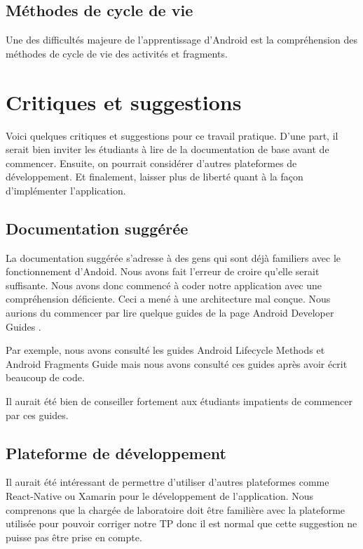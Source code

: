 \documentclass[12pt]{article}
\begin{document}
\subsection{Méthodes de cycle de vie}

	Une des difficultés majeure de l'apprentissage d'Android est la
	compréhension des méthodes de cycle de vie des activités et fragments.

\section{Critiques et suggestions}

	Voici quelques critiques et suggestions pour ce travail pratique.  D'une
	part, il serait bien inviter les étudiants à lire de la documentation de
	base avant de commencer. Ensuite, on pourrait considérer d'autres
	plateformes de développement. Et finalement, laisser plus de liberté quant à
	la façon d'implémenter l'application.

\subsection{Documentation suggérée}

	La documentation suggérée s'adresse à des gens qui sont déjà familiers avec
	le fonctionnement d'Andoid.  Nous avons fait l'erreur de croire qu'elle
	serait suffisante.  Nous avons donc commencé à coder notre application avec
	une compréhension déficiente.  Ceci a mené à une architecture mal conçue.
	Nous aurions du commencer par lire quelque guides de la page Android
	Developer Guides .

	Par exemple, nous avons consulté les guides Android Lifecycle Methods
	 et Android Fragments Guide 
	mais nous avons consulté ces guides après avoir écrit beaucoup de code.

	Il aurait été bien de conseiller fortement aux étudiants impatients de
	commencer par ces guides.

\subsection{Plateforme de développement}

	Il aurait été intéressant de permettre d'utiliser d'autres plateformes comme
	React-Native ou Xamarin pour le développement de l'application.  Nous
	comprenons que la chargée de laboratoire doit être familière avec la
	plateforme utilisée pour pouvoir corriger notre TP donc il est normal que
	cette suggestion ne puisse pas être prise en compte.
\end{document}
